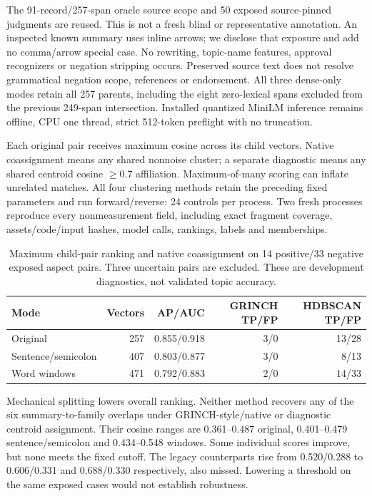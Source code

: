 \documentclass[11pt]{article}
\begin{document}
The 91-record/257-span oracle source scope and 50 exposed source-pinned judgments
are reused. This is not a fresh blind or representative annotation. An inspected
known summary uses inline arrows; we disclose that exposure and add no
comma/arrow special case. No rewriting, topic-name features, approval recognizers
or negation stripping occurs. Preserved source text does not resolve grammatical
negation scope, references or endorsement. All three dense-only modes retain
all 257 parents, including the eight zero-lexical spans excluded from the previous
249-span intersection. Installed quantized MiniLM inference remains offline,
CPU one thread, strict 512-token preflight with no truncation.

Each original pair receives maximum cosine across its child vectors. Native
coassignment means any shared nonnoise cluster; a separate diagnostic means
any shared centroid cosine $\geq0.7$ affiliation. Maximum-of-many scoring can
inflate unrelated matches. All four clustering methods retain the preceding
fixed parameters and run forward/reverse: 24 controls per process. Two fresh
processes reproduce every nonmeasurement field, including exact fragment
coverage, assets/code/input hashes, model calls, rankings, labels and memberships.

\begin{table}[ht]
\centering
\begin{tabular}{lrrrr}
\toprule
Mode &Vectors&AP/AUC&GRINCH TP/FP&HDBSCAN TP/FP\\
\midrule
Original &257&0.855/0.918&3/0&13/28\\
Sentence/semicolon &407&0.803/0.877&3/0&8/13\\
Word windows &471&0.792/0.883&2/0&14/33\\
\bottomrule
\end{tabular}
\caption{Maximum child-pair ranking and native coassignment on 14 positive/33
negative exposed aspect pairs. Three uncertain pairs are excluded. These are
development diagnostics, not validated topic accuracy.}
\end{table}

Mechanical splitting lowers overall ranking. Neither method recovers any of
the six summary-to-family overlaps under GRINCH-style/native or diagnostic
centroid assignment. Their cosine ranges are 0.361--0.487 original,
0.401--0.479 sentence/semicolon and 0.434--0.548 windows. Some individual scores
improve, but none meets the fixed cutoff. The legacy counterparts rise from
0.520/0.288 to 0.606/0.331 and 0.688/0.330 respectively, also missed.
Lowering a threshold on the same exposed cases would not establish robustness.
\end{document}

